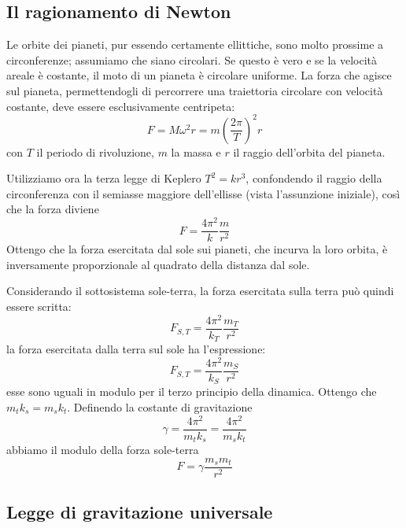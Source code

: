 \documentclass[class=book, crop=false, oneside, 12pt]{standalone}
\begin{document}
\subsection{Il ragionamento di Newton}

Le orbite dei pianeti, pur essendo certamente ellittiche, sono molto prossime a circonferenze; assumiamo che siano circolari.\newline
Se questo è vero e se la velocità areale è costante, il moto di un pianeta è circolare uniforme.
La forza che agisce sul pianeta, permettendogli di percorrere una traiettoria circolare  con velocità costante, deve essere esclusivamente centripeta:
\begin{equation}
    F = M \omega^2 r = m \left(\frac{2 \pi}{T}\right)^2 r
\end{equation}
con \(T\) il periodo di rivoluzione, \(m\) la massa e \(r\) il raggio dell'orbita del pianeta. 

Utilizziamo ora la terza legge di Keplero $T^2 = k r^3$, confondendo il raggio della circonferenza con il semiasse maggiore dell'ellisse (vista l'assunzione iniziale), così che la forza diviene
\begin{equation*}
    F = \frac{4 \pi^2}{k} \frac{m}{r^2}
\end{equation*}
Ottengo che la forza esercitata dal sole sui pianeti, che incurva la loro orbita, è inversamente proporzionale al quadrato della distanza dal sole.

Considerando il sottosistema sole-terra, la forza esercitata sulla terra può quindi essere scritta:
\begin{equation*}
    F_{S,T} = \frac{4 \pi^2}{k_T} \frac{m_T}{r^2}
\end{equation*}
la forza esercitata dalla terra sul sole ha l'espressione:
\begin{equation*}
    F_{S,T} = \frac{4 \pi^2}{k_S} \frac{m_S}{r^2}
\end{equation*}
esse sono uguali in modulo per il terzo principio della dinamica.
Ottengo che \(m_t k_s = m_s k_t\).
Definendo la costante di gravitazione
\begin{equation}
    \gamma = \frac{4 \pi^2}{m_t k_s} = \frac{4 \pi^2}{m_s k_t}
\end{equation}
abbiamo il modulo della forza sole-terra
\begin{equation}
    F = \gamma \frac{m_s m_t}{r^2}
\end{equation}

\subsection{Legge di gravitazione universale}
\end{document}
